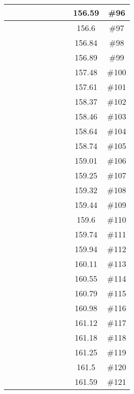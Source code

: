 \begin{center}
\begin{longtable}{|c|c|c|c|c|c|c|c|c|c|}
 \x &  &  &  \x &  \x &  &  \x &  \x & 156.59 & \#96 \\ \hline
 \x &  &  &  &  &  \x &  \x &  & 156.6 & \#97 \\ \hline
 \x &  &  \x &  &  \x &  \x &  \x &  \x & 156.84 & \#98 \\ \hline
 \x &  &  \x &  &  &  &  \x &  & 156.89 & \#99 \\ \hline
 \x &  \x &  &  \x &  \x &  &  \x &  \x & 157.48 & \#100 \\ \hline
 \x &  &  &  \x &  &  &  \x &  & 157.61 & \#101 \\ \hline
 \x &  &  &  \x &  \x &  &  &  \x & 158.37 & \#102 \\ \hline
 \x &  \x &  &  &  \x &  &  \x &  & 158.46 & \#103 \\ \hline
 \x &  \x &  &  \x &  \x &  &  &  \x & 158.64 & \#104 \\ \hline
 \x &  \x &  &  &  &  &  \x &  \x & 158.74 & \#105 \\ \hline
 \x &  \x &  &  &  \x &  \x &  \x &  & 159.01 & \#106 \\ \hline
 \x &  &  \x &  &  \x &  &  \x &  \x & 159.25 & \#107 \\ \hline
 \x &  \x &  \x &  \x &  \x &  &  \x &  & 159.32 & \#108 \\ \hline
 \x &  \x &  \x &  &  \x &  &  \x &  \x & 159.44 & \#109 \\ \hline
 \x &  &  \x &  &  &  \x &  \x &  \x & 159.6 & \#110 \\ \hline
 \x &  \x &  \x &  &  \x &  &  &  & 159.74 & \#111 \\ \hline
 \x &  &  &  \x &  &  &  \x &  \x & 159.94 & \#112 \\ \hline
 \x &  \x &  &  \x &  &  \x &  \x &  & 160.11 & \#113 \\ \hline
 \x &  \x &  \x &  \x &  \x &  &  &  & 160.55 & \#114 \\ \hline
 \x &  &  &  &  \x &  &  \x &  \x & 160.79 & \#115 \\ \hline
 \x &  &  &  &  &  &  \x &  & 160.98 & \#116 \\ \hline
 \x &  \x &  &  \x &  \x &  &  \x &  & 161.12 & \#117 \\ \hline
 \x &  &  &  &  &  &  \x &  \x & 161.18 & \#118 \\ \hline
 \x &  &  \x &  &  &  &  \x &  \x & 161.25 & \#119 \\ \hline
 \x &  &  \x &  \x &  \x &  &  &  \x & 161.5 & \#120 \\ \hline
 \x &  &  &  &  \x &  &  \x &  & 161.59 & \#121 \\ \hline

\end{longtable}
\end{center}
